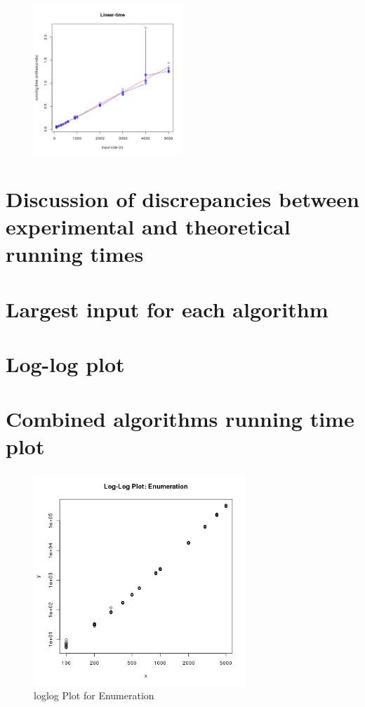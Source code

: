 \documentclass[11pt]{scrreprt}
\begin{document}
\begin{figure}
{		\includegraphics[width=0.50\textwidth]{linear_time.png}%
		\label{fig:1a}%
		\label{fig:1b}%
		\label{fig:1c}%
		\label{fig:1d}%
	}%
\end{figure}



\section{Discussion of discrepancies between experimental and theoretical running times}

\section{Largest input for each algorithm}

\section{Log-log plot}

\section{Combined algorithms running time plot}

\begin{figure}[!htb]
\centering
\includegraphics[width=8cm]{loglog_enumeration.png}
\caption{loglog Plot for Enumeration}
\label{figc1}
\end{figure}
\end{document}
